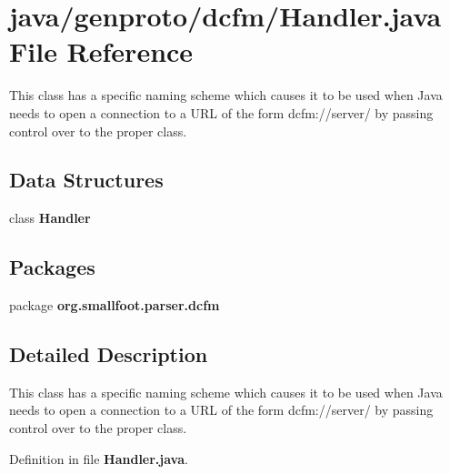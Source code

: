\section{java/genproto/dcfm/\+Handler.java File Reference}
\label{dcfm_2Handler_8java}


This class has a specific naming scheme which causes it to be used when Java needs to open a connection to a U\+R\+L of the form dcfm\+://server/ by passing control over to the proper class.  


\subsection*{Data Structures}
\begin{DoxyCompactItemize}
\item 
class {\bf Handler}
\end{DoxyCompactItemize}
\subsection*{Packages}
\begin{DoxyCompactItemize}
\item 
package {\bf org.\+smallfoot.\+parser.\+dcfm}
\end{DoxyCompactItemize}


\subsection{Detailed Description}
This class has a specific naming scheme which causes it to be used when Java needs to open a connection to a U\+R\+L of the form dcfm\+://server/ by passing control over to the proper class. 



Definition in file {\bf Handler.\+java}.

